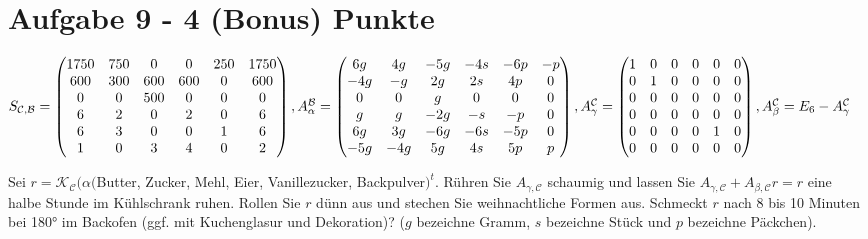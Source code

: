 \section*{Aufgabe 9 - 4 (Bonus) Punkte}
    $S_{\mathcal{C},\mathcal{B}} = \begin{pmatrix}
    1750 & 750 & 0&0&250&1750\\
    600&300&600&600&0&600\\
    0&0&500&0&0&0\\
    6&2&0&2&0&6\\
    6&3&0&0&1&6\\
    1&0&3&4&0&2
    \end{pmatrix}, A_{\alpha}^{\mathcal{B}} = \begin{pmatrix}
    6g&4g&-5g&-4s&-6p&-p\\
    -4g&-g&2g&2s&4p&0\\
    0&0&g&0&0&0\\
    g&g&-2g&-s&-p&0\\
    6g&3g&-6g&-6s&-5p&0\\
    -5g&-4g&5g&4s&5p&p
    \end{pmatrix},\\
     A_{\gamma}^{\mathcal{C}} = \begin{pmatrix}
    1&0&0&0&0&0\\
    0&1&0&0&0&0\\
    0&0&0&0&0&0\\
    0&0&0&0&0&0\\
    0&0&0&0&1&0\\
    0&0&0&0&0&0\\
    \end{pmatrix},
    A_{\beta}^{\mathcal{C}} = E_6 - A_{\gamma}^{\mathcal{C}} $

    Sei $r = \mathcal{K}_{\mathcal{C}}(\alpha($Butter, Zucker, Mehl, Eier, Vanillezucker, Backpulver$)^t$. Rühren Sie $A_{\gamma,\mathcal{C}}$ schaumig und lassen Sie $A_{\gamma,\mathcal{C}} + A_{\beta,\mathcal{C}} r = r$ eine halbe Stunde im Kühlschrank ruhen. Rollen
    Sie $r$ dünn aus und stechen Sie weihnachtliche Formen aus.
    Schmeckt $r$ nach 8 bis 10 Minuten bei 180° im Backofen (ggf. mit Kuchenglasur und Dekoration)?
    ($g$ bezeichne Gramm, $s$ bezeichne Stück und $p$ bezeichne Päckchen).


